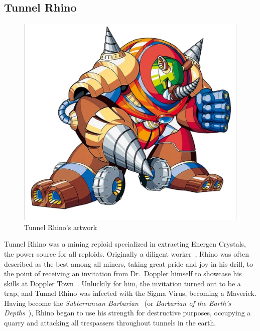 \subsection{Tunnel Rhino}\label{boss:Tunnel_rhino}
\begin{figure}[htp]
	\centering
	\includegraphics[height=\portraitsize]{figures/X3/Tunnel_rhino/tunnelrhino.png}
	\caption{Tunnel Rhino's artwork~\cite{book:MMX_Complete_art}}
\end{figure}
Tunnel Rhino was a mining reploid specialized in extracting Energen Crystals, the power source for all reploids. Originally a diligent worker~\cite{wayback:X3_resources}, Rhino was often described as the best among all miners, taking great pride and joy in his drill, to the point of receiving an invitation from Dr.~Doppler himself to showcase his skills at Doppler Town~\cite{Xcoll1:Manual_X3}. Unluckily for him, the invitation turned out to be a trap, and Tunnel Rhino was infected with the Sigma Virus, becoming a Maverick. Having become the \textit{Subterranean Barbarian}~\cite{book:MMX_Complete_art} (or \textit{Barbarian of the Earth's Depths}~\cite{wayback:X3_resources,book:Compendium}), Rhino began to use his strength for destructive purposes, occupying a quarry and attacking all trespassers throughout tunnels in the earth.

